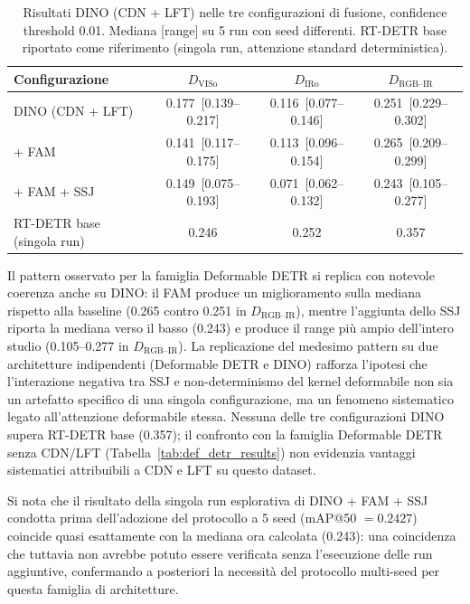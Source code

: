 \documentclass[a4paper,11pt]{article}
\begin{document}
\begin{table}[h]
\centering
\caption{Risultati DINO (CDN + LFT) nelle tre configurazioni di fusione, confidence threshold 0.01. Mediana [range] su 5 run con seed differenti. RT-DETR base riportato come riferimento (singola run, attenzione standard deterministica).}
\label{tab:dino}
\begin{tabular}{lccc}
\toprule
Configurazione & $D_{\text{VISo}}$ & $D_{\text{IRo}}$ & $D_{\text{RGB--IR}}$ \\
\midrule
DINO (CDN + LFT)         & 0.177~[0.139--0.217] & 0.116~[0.077--0.146] & 0.251~[0.229--0.302] \\
\quad + FAM              & 0.141~[0.117--0.175] & 0.113~[0.096--0.154] & 0.265~[0.209--0.299] \\
\quad + FAM + SSJ & 0.149~[0.075--0.193] & 0.071~[0.062--0.132] & 0.243~[0.105--0.277] \\
\midrule
RT-DETR base (singola run) & 0.246 & 0.252 & 0.357 \\
\bottomrule
\end{tabular}
\end{table}

Il pattern osservato per la famiglia Deformable DETR si replica con notevole coerenza anche su DINO: il FAM produce un miglioramento sulla mediana rispetto alla baseline (0.265 contro 0.251 in $D_{\text{RGB--IR}}$), mentre l'aggiunta dello SSJ riporta la mediana verso il basso (0.243) e produce il range più ampio dell'intero studio (0.105--0.277 in $D_{\text{RGB--IR}}$). La replicazione del medesimo pattern su due architetture indipendenti (Deformable DETR e DINO) rafforza l'ipotesi che l'interazione negativa tra SSJ e non-determinismo del kernel deformabile non sia un artefatto specifico di una singola configurazione, ma un fenomeno sistematico legato all'attenzione deformabile stessa. Nessuna delle tre configurazioni DINO supera RT-DETR base (0.357); il confronto con la famiglia Deformable DETR senza CDN/LFT (Tabella~\ref{tab:def_detr_results}) non evidenzia vantaggi sistematici attribuibili a CDN e LFT su questo dataset.

Si nota che il risultato della singola run esplorativa di DINO + FAM + SSJ condotta prima dell'adozione del protocollo a 5 seed (mAP@50 $= 0.2427$) coincide quasi esattamente con la mediana ora calcolata (0.243): una coincidenza che tuttavia non avrebbe potuto essere verificata senza l'esecuzione delle run aggiuntive, confermando a posteriori la necessità del protocollo multi-seed per questa famiglia di architetture.
\end{document}
